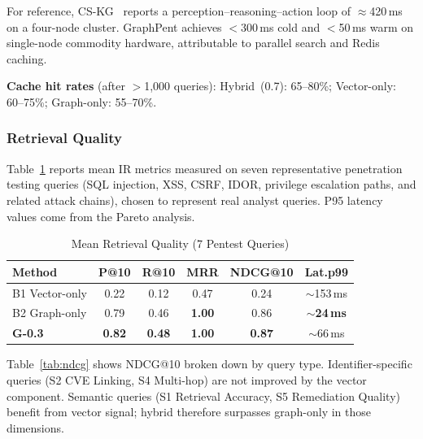 \documentclass[conference]{IEEEtran}
\begin{document}
For reference, CS-KG~\cite{pan2025cskg} reports a perception--reasoning--action
loop of $\approx$420\,ms on a four-node cluster.
GraphPent achieves $<$300\,ms cold and $<$50\,ms warm on single-node commodity
hardware, attributable to parallel search and Redis caching.

\textbf{Cache hit rates} (after $>$1,000 queries):
Hybrid~(0.7): 65--80\%; Vector-only: 60--75\%; Graph-only: 55--70\%.

\subsubsection{Retrieval Quality}

Table~\ref{tab:retrieval} reports mean IR metrics measured on seven
representative penetration testing queries (SQL injection, XSS, CSRF, IDOR,
privilege escalation paths, and related attack chains), chosen to represent
real analyst queries.
P95 latency values come from the Pareto analysis.

\begin{table}[htbp]
  \centering
  \caption{Mean Retrieval Quality (7 Pentest Queries)}
  \label{tab:retrieval}
  \begin{tabular}{lccccc}
    \toprule
    \textbf{Method} & \textbf{P@10} & \textbf{R@10} & \textbf{MRR}
      & \textbf{NDCG@10} & \textbf{Lat.p99} \\
    \midrule
    B1 Vector-only  & 0.22 & 0.12 & 0.47 & 0.24 & $\sim$153\,ms \\
    B2 Graph-only   & 0.79 & 0.46 & \textbf{1.00} & 0.86
                    & $\sim$\textbf{24\,ms} \\
    \textbf{G-0.3}  & \textbf{0.82} & \textbf{0.48} & \textbf{1.00}
                    & \textbf{0.87} & $\sim$66\,ms \\
    \bottomrule
  \end{tabular}
\end{table}

Table~\ref{tab:ndcg} shows NDCG@10 broken down by query type.
Identifier-specific queries (S2 CVE Linking, S4 Multi-hop) are not improved
by the vector component.
Semantic queries (S1 Retrieval Accuracy, S5 Remediation Quality) benefit from
vector signal; hybrid therefore surpasses graph-only in those dimensions.
\end{document}
